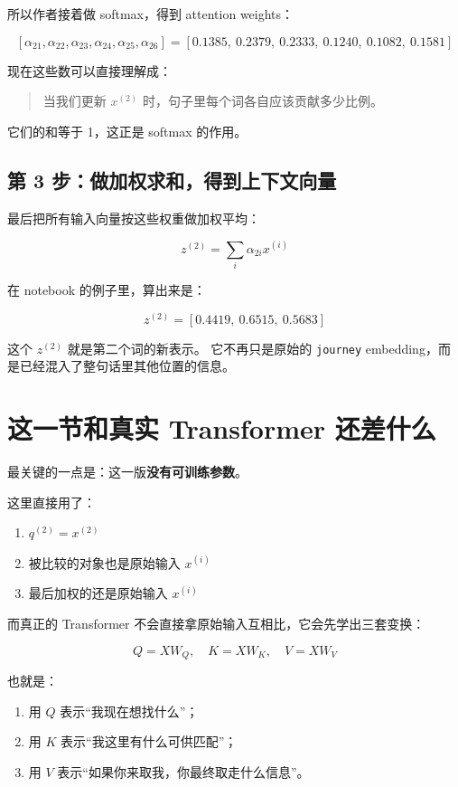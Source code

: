 \documentclass[12pt,a4paper]{ctexart}
\begin{document}
所以作者接着做 softmax，得到 attention weights：

\[
[\alpha_{21}, \alpha_{22}, \alpha_{23}, \alpha_{24}, \alpha_{25}, \alpha_{26}]
= [0.1385,\ 0.2379,\ 0.2333,\ 0.1240,\ 0.1082,\ 0.1581]
\]

现在这些数可以直接理解成：

\begin{quote}
当我们更新 \(x^{(2)}\) 时，句子里每个词各自应该贡献多少比例。
\end{quote}

它们的和等于 1，这正是 softmax 的作用。

\subsection{第 3 步：做加权求和，得到上下文向量}

最后把所有输入向量按这些权重做加权平均：

\[
z^{(2)} = \sum_i \alpha_{2i} x^{(i)}
\]

在 notebook 的例子里，算出来是：

\[
z^{(2)} = [0.4419,\ 0.6515,\ 0.5683]
\]

这个 \(z^{(2)}\) 就是第二个词的新表示。
它不再只是原始的 \texttt{journey} embedding，而是已经混入了整句话里其他位置的信息。

\section{这一节和真实 Transformer 还差什么}

最关键的一点是：这一版\textbf{没有可训练参数}。

这里直接用了：

\begin{enumerate}[leftmargin=2em]
  \item \(q^{(2)} = x^{(2)}\)
  \item 被比较的对象也是原始输入 \(x^{(i)}\)
  \item 最后加权的还是原始输入 \(x^{(i)}\)
\end{enumerate}

而真正的 Transformer 不会直接拿原始输入互相比，它会先学出三套变换：

\[
Q = XW_Q,\quad K = XW_K,\quad V = XW_V
\]

也就是：

\begin{enumerate}[leftmargin=2em]
  \item 用 \(Q\) 表示``我现在想找什么''；
  \item 用 \(K\) 表示``我这里有什么可供匹配''；
  \item 用 \(V\) 表示``如果你来取我，你最终取走什么信息''。
\end{enumerate}
\end{document}
